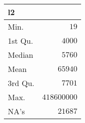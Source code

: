 %
\begin{table}[!tbp]
\begin{center}
\begin{tabular}{lr}
\hline\hline
\multicolumn{1}{l}{l2}&\multicolumn{1}{c}{}\tabularnewline
\hline
Min.&$       19$\tabularnewline
1st Qu.&$     4000$\tabularnewline
Median&$     5760$\tabularnewline
Mean&$    65940$\tabularnewline
3rd Qu.&$     7701$\tabularnewline
Max.&$418600000$\tabularnewline
NA's&$    21687$\tabularnewline
\hline
\end{tabular}
\end{center}
\end{table}

